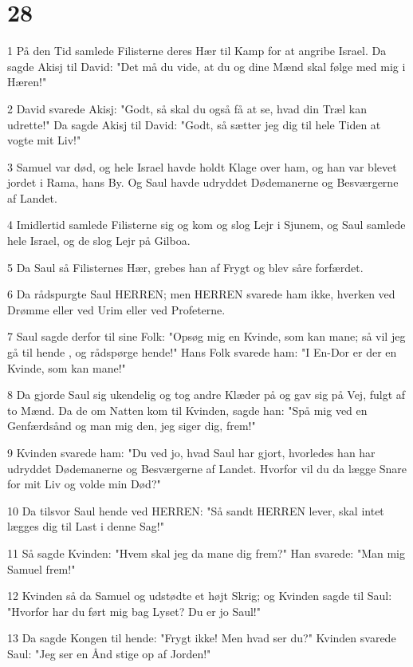 \chapter{28}

\par 1 På den Tid samlede Filisterne deres Hær til Kamp for at angribe Israel. Da sagde Akisj til David: "Det må du vide, at du og dine Mænd skal følge med mig i Hæren!"
\par 2 David svarede Akisj: "Godt, så skal du også få at se, hvad din Træl kan udrette!" Da sagde Akisj til David: "Godt, så sætter jeg dig til hele Tiden at vogte mit Liv!"
\par 3 Samuel var død, og hele Israel havde holdt Klage over ham, og han var blevet jordet i Rama, hans By. Og Saul havde udryddet Dødemanerne og Besværgerne af Landet.
\par 4 Imidlertid samlede Filisterne sig og kom og slog Lejr i Sjunem, og Saul samlede hele Israel, og de slog Lejr på Gilboa.
\par 5 Da Saul så Filisternes Hær, grebes han af Frygt og blev såre forfærdet.
\par 6 Da rådspurgte Saul HERREN; men HERREN svarede ham ikke, hverken ved Drømme eller ved Urim eller ved Profeterne.
\par 7 Saul sagde derfor til sine Folk: "Opsøg mig en Kvinde, som kan mane; så vil jeg gå til hende , og rådspørge hende!" Hans Folk svarede ham: "I En-Dor er der en Kvinde, som kan mane!"
\par 8 Da gjorde Saul sig ukendelig og tog andre Klæder på og gav sig på Vej, fulgt af to Mænd. Da de om Natten kom til Kvinden, sagde han: "Spå mig ved en Genfærdsånd og man mig den, jeg siger dig, frem!"
\par 9 Kvinden svarede ham: "Du ved jo, hvad Saul har gjort, hvorledes han har udryddet Dødemanerne og Besværgerne af Landet. Hvorfor vil du da lægge Snare for mit Liv og volde min Død?"
\par 10 Da tilsvor Saul hende ved HERREN: "Så sandt HERREN lever, skal intet lægges dig til Last i denne Sag!"
\par 11 Så sagde Kvinden: "Hvem skal jeg da mane dig frem?" Han svarede: "Man mig Samuel frem!"
\par 12 Kvinden så da Samuel og udstødte et højt Skrig; og Kvinden sagde til Saul: "Hvorfor har du ført mig bag Lyset? Du er jo Saul!"
\par 13 Da sagde Kongen til hende: "Frygt ikke! Men hvad ser du?" Kvinden svarede Saul: "Jeg ser en Ånd stige op af Jorden!"

